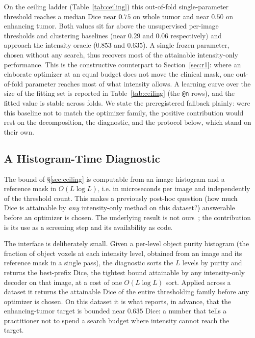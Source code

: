 On the ceiling ladder (Table~\ref{tab:ceiling}) this out-of-fold single-parameter
threshold reaches a median Dice near $0.75$ on whole tumor and near $0.50$ on
enhancing tumor. Both values sit far above the unsupervised per-image thresholds
and clustering baselines (near $0.29$ and $0.06$ respectively) and approach the
intensity oracle ($0.853$ and $0.635$). A single frozen parameter, chosen without
any search, thus recovers most of the attainable intensity-only performance.
This is the constructive counterpart to Section~\ref{sec:r1}: where an elaborate
optimizer at an equal budget does not move the clinical mask, one out-of-fold
parameter reaches most of what intensity allows. A learning curve over the size
of the fitting set is reported in Table~\ref{tab:ceiling} (the \texttt{@n} rows),
and the fitted value is stable across folds. We state the preregistered fallback
plainly: were this baseline not to match the optimizer family, the positive
contribution would rest on the decomposition, the diagnostic, and the protocol
below, which stand on their own.

\subsection{A Histogram-Time Diagnostic}

The bound of §\ref{sec:ceiling} is computable from an image histogram and a
reference mask in $O(L \log L)$, i.e. in microseconds per image and independently
of the threshold count. This makes a previously post-hoc question (how much
Dice is attainable by \emph{any} intensity-only method on this dataset?)
answerable before an optimizer is chosen. The underlying result is not
ours~\cite{lipton_f1}; the contribution is its use as a screening step and its
availability as code.

The interface is deliberately small. Given a per-level object purity histogram
(the fraction of object voxels at each intensity level, obtained from an image
and its reference mask in a single pass), the diagnostic sorts the $L$ levels
by purity and returns the best-prefix Dice, the tightest bound attainable by any
intensity-only decoder on that image, at a cost of one $O(L\log L)$ sort. Applied
across a dataset it returns the attainable Dice of the entire thresholding family
before any optimizer is chosen. On this dataset it is what reports, in advance,
that the enhancing-tumor target is bounded near $0.635$ Dice: a number that tells
a practitioner not to spend a search budget where intensity cannot reach the
target.

